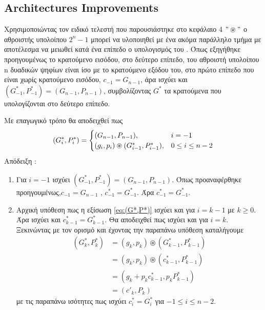 \subsection{Architectures Improvements}

Χρησιμοποιώντας τον ειδικό τελεστή που παρουσιάστηκε στο κεφάλαιο 4 $"\circledast"$
ο αθροιστής υπολοίπου $2^n-1$ μπορεί να υλοποιηθεί με ένα ακόμα παράλληλο τμήμα 
με αποτέλεσμα να μειωθεί κατά ένα επίπεδο ο υπολογισμός του \cite{863036}.
Όπως εξηγήθηκε προηγουμένως το κρατούμενο εισόδου, στο δεύτερο επίπεδο, του αθροιστή υπολοίπου n
δυαδικών ψηφίων είναι ίσο με το κρατούμενο εξόδου  του, στο πρώτο επίπεδο που είναι 
χωρίς κρατούμενο εισόδου, $c_{-1} = G_{n-1}$, άρα ισχύει και 
$(G^*_{-1},P^*_{-1}) = (G_{n-1},P_{n-1})$, συμβολίζοντας $G^*$ τα κρατούμενα που υπολογίζονται 
στο δεύτερο επίπεδο.

Με επαγωγικό τρόπο θα αποδειχθεί πως
\begin{equation}
\label{eq:(G*,P*)}
\equationame{Εξίσωση κρατουμένων του $2^n-1$ αθροιστή}
    (G^*_i,P^*_i) =
    \begin{cases}
        (G_{n-1},P_{n-1}) ,& i = -1\\
        (g_i,p_i)\circledast(G^*_{i-1},P^*_{i-1}) ,& 0\leq i \leq n-2
    \end{cases}
\end{equation}
Απόδειξη :
\begin{enumerate}
    \item Για $i=-1$ ισχύει $(G^*_{-1},P^*_{-1}) = (G_{n-1},P_{n-1})$. Όπως προαναφέρθηκε προηγουμένως,$c_{-1} = G_{n-1}$ , $c^*_{-1} = G^*_{-1}$. Άρα $c^*_{-1} = G^*_{-1}$.
    \item Αρχική υπόθεση πως η εξίσωση \ref{eq:(G*,P*)} ισχύει και για $i=k-1$ με $k \geq 0$.
    Άρα ισχύει και $c^*_{k-1} = G^*_{k-1}$. Θα αποδειχθεί πως ισχύει και για $i=k$. Ξεκινώντας 
    με τον ορισμό και έχοντας την παραπάνω υπόθεση καταλήγουμε 
    \begin{equation*}
    \begin{split}
        (G^*_k,P^*_k) &= (g_k,p_k) \circledast (G^*_{k-1},P^*_{k-1})\\
        &= (g_k,p_k) \circledast (c^*_{k-1},P^*_{k-1})\\
        &= (g_k + p_k c^*_{k-1} , p_k P^*_{k-1})\\
        &= (c'_{k},P_k)
    \end{split}
    \end{equation*}
    με τις παραπάνω ισότητες πως ισχύει $c^*_i = G^*_i$ για $-1 \leq i \leq n-2$.
\end{enumerate}

